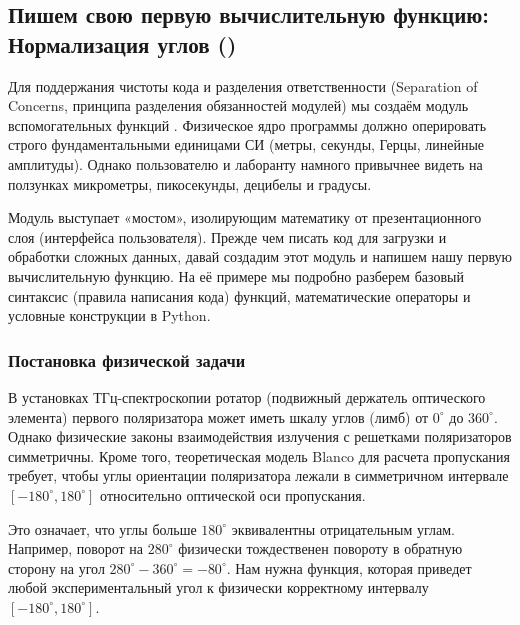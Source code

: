 
\subsection{Пишем свою первую вычислительную функцию: Нормализация углов ()}

Для поддержания чистоты кода и разделения ответственности (Separation of Concerns, принципа разделения обязанностей модулей) мы создаём модуль вспомогательных функций . Физическое ядро программы должно оперировать строго фундаментальными единицами СИ (метры, секунды, Герцы, линейные амплитуды). Однако пользователю и лаборанту намного привычнее видеть на ползунках микрометры, пикосекунды, децибелы и градусы. 

Модуль  выступает «мостом», изолирующим математику от презентационного слоя (интерфейса пользователя). Прежде чем писать код для загрузки и обработки сложных данных, давай создадим этот модуль и напишем нашу первую вычислительную функцию. На её примере мы подробно разберем базовый синтаксис (правила написания кода) функций, математические операторы и условные конструкции в Python.

\subsubsection{Постановка физической задачи}

В установках ТГц-спектроскопии ротатор (подвижный держатель оптического элемента) первого поляризатора может иметь шкалу углов (лимб) от $0^\circ$ до $360^\circ$. Однако физические законы взаимодействия излучения с решетками поляризаторов симметричны. Кроме того, теоретическая модель Blanco для расчета пропускания требует, чтобы углы ориентации поляризатора лежали в симметричном интервале $[-180^\circ, 180^\circ]$ относительно оптической оси пропускания.

Это означает, что углы больше $180^\circ$ эквивалентны отрицательным углам. Например, поворот на $280^\circ$ физически тождественен повороту в обратную сторону на угол $280^\circ - 360^\circ = -80^\circ$. Нам нужна функция, которая приведет любой экспериментальный угол к физически корректному интервалу $[-180^\circ, 180^\circ]$.

